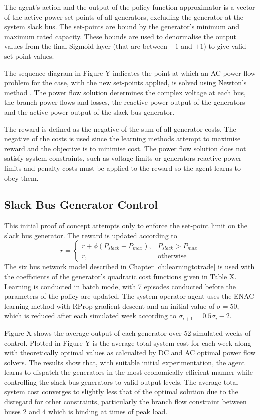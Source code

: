The agent's action and the output of the policy function approximator is a
vector of the active power set-points of all generators, excluding the
generator at the system slack bus.  The set-points are bound by the generator's minimum
and maximum rated capacity. These bounds are used to denormalise the output
values from the final Sigmoid layer (that are between $-1$ and $+1$) to give
valid set-point values.

The sequence diagram in Figure Y indicates the point at which an AC power flow
problem for the case, with the new set-points applied, is solved using Newton's
method \cite{tinney:67}.  The power flow solution determines the complex
voltage at each bus, the branch power flows and losses, the reactive power
output of the generators and the active power output of the slack bus
generator.

The reward is defined as the negative of the sum of all generator costs.  The
negative of the costs is used since the learning methods attempt to maximise
reward and the objective is to minimise cost.  The power flow solution does not
satisfy system constraints, such as voltage limits or generators reactive power
limits and penalty costs must be applied to the reward so the agent learns to
obey them.

\subsection{Slack Bus Generator Control}
This initial proof of concept attempts only to enforce the set-point limit on
the slack bus generator.  The reward is updated according to
\begin{equation}
r =
\begin{cases}
r + \phi (P_{slack} - P_{max}), & \text{$P_{slack} > P_{max}$} \\
r, & \text{otherwise}
\end{cases}
\end{equation}
The six bus network model described in Chapter \ref{ch:learningtotrade} is used
with the coefficients of the generator's quadratic cost functions given in Table X.  Learning is conducted in batch
mode, with 7 episodes conducted before the parameters of the policy are
updated.  The system operator agent uses the ENAC learning method with RProp
gradient descent and an initial value of $\sigma = 50$, which is reduced after
each simulated week according to $\sigma_{i+1} = 0.5\sigma_i - 2$.

Figure X shows the average output of each generator over 52 simulated weeks of
control. Plotted in Figure Y is the average total system cost for each week along with
theoretically optimal values as calcualted by DC and AC optimal power flow
solvers.  The results show that, with suitable initial experimentation, the
agent learns to dispatch the generators in the most economically efficient
manner while controlling the slack bus generators to valid output levels.  The
average total system cost converges to slightly less that of the optimal
solution due to the disregard for other constraints, particularly the
branch flow constraint between buses 2 and 4 which is binding at times of peak
load.

